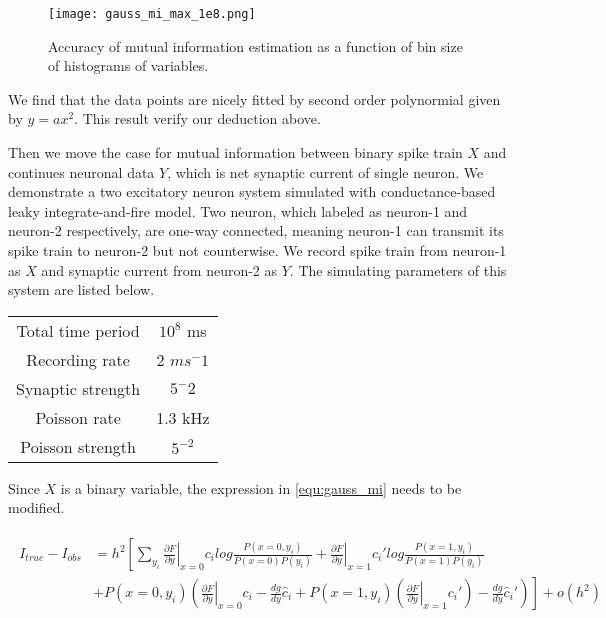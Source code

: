 \documentclass[paper=a4, fontsize=11pt]{article} %
\numberwithin{equation}{section} %
\numberwithin{figure}{section} %
\numberwithin{table}{section} %
\begin{document}
\begin{figure}[H]
	\centering
	\texttt{[image: gauss\_mi\_max\_1e8.png]}
	\caption{Accuracy of mutual information estimation as a function of bin size of histograms of variables.}
	\label{fig:gauss_mi_max}
\end{figure}

We find that the data points are nicely fitted by second order polynormial given by $y= ax^2$. This result verify our deduction above.

Then we move the case for mutual information between binary spike train $X$ and continues neuronal data $Y$, which is net synaptic current of single neuron. We demonstrate a two excitatory neuron system simulated with conductance-based leaky integrate-and-fire model. Two neuron, which labeled as neuron-1 and neuron-2 respectively, are one-way connected, meaning neuron-1 can transmit its spike train to neuron-2 but not counterwise. We record spike train from neuron-1 as $X$ and synaptic current from neuron-2 as $Y$. The simulating parameters of this system are listed below.

\begin{table}[H]
	\centering
	\begin{tabular}{c|c}
		\hline
		\hline
		Total time period & $10^8$ ms \\
		Recording rate & 2 $ms^-1$ \\
		Synaptic strength & $5^-2$ \\
		Poisson rate & 1.3 kHz \\
		Poisson strength & $5^{-2}$ \\
		\hline
		\hline
	\end{tabular}
\end{table}

Since $X$ is a binary variable, the expression in \ref{equ:gauss_mi} needs to be modified.

\begin{align}
	\begin{split}
		I_{true}	- I_{obs} &= h^2\left[\sum_{y_i}\left.\frac{\partial F}{\partial y}\right|_{x=0}c_ilog\frac{P(x=0,y_i)}{P(x=0)P(y_i)} + \left.\frac{\partial F}{\partial y}\right|_{x=1}c_i'log\frac{P(x=1,y_i)}{P(x=1)P(y_i)}\right. \\
		&\left.+ P(x=0,y_i)(\left.\frac{\partial F}{\partial y}\right|_{x=0}c_i- \frac{dg}{dy}\hat{c}_i + P(x=1,y_i)(\left.\frac{\partial F}{\partial y}\right|_{x=1}c_i') - \frac{dg}{dy}\hat{c}_i')\right] + o(h^2)
	\end{split}
\end{align}
\end{document}

